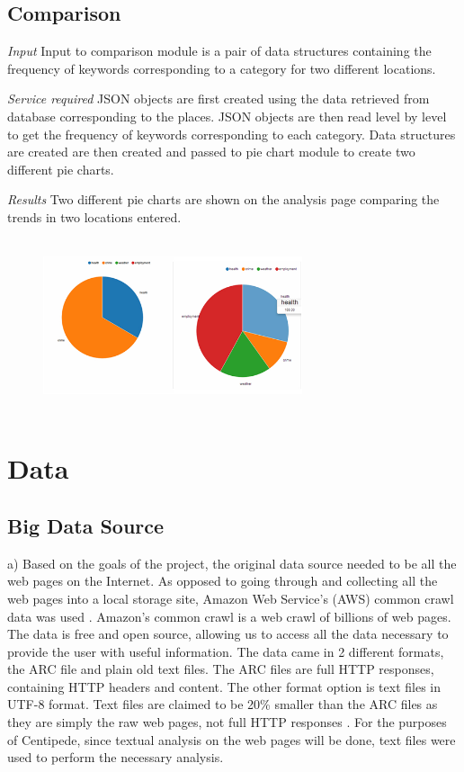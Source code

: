 \documentclass[conference]{IEEEtran}
\begin{document}
\subsection{Comparison}

\textit{Input} Input to comparison module is a pair of data structures containing the frequency of keywords corresponding to a category for two different locations. 

\textit{Service required} JSON objects are first created using the data retrieved from database corresponding to the places. JSON objects are then read level by level to get the frequency of keywords corresponding to each category. Data structures are created are then created and passed to pie chart module to create two different pie charts. 

\textit{Results} Two different pie charts are shown on the analysis page comparing the trends in two locations entered. 

\begin{figure}[h]
\includegraphics[height=2in, width=3in]{5.png}
\label{5}
\end{figure}

\section{Data}

\subsection{Big Data Source}

a)  Based on the goals of the project, the original data source needed to be all the web pages on the Internet. As opposed to going through and collecting all the web pages into a local storage site, Amazon Web Service’s (AWS) common crawl data was used \cite{amazon:aws}. Amazon’s common crawl is a web crawl of billions of web pages. The data is free and open source, allowing us to access all the data necessary to provide the user with useful information. The data came in 2 different formats, the ARC file and plain old text files. The ARC files are full HTTP responses, containing HTTP headers and content. The other format option is text files in UTF-8 format. Text files are claimed to be 20\% smaller than the ARC files as they are simply the raw web pages, not full HTTP responses \cite{commoncrawl:data}. For the purposes of Centipede, since textual analysis on the web pages will be done, text files were used to perform the necessary analysis. 
\end{document}
